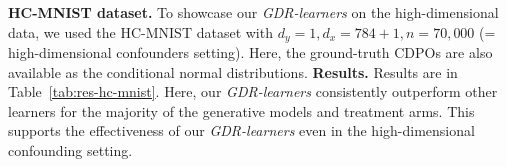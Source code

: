 \documentclass[dvipsnames]{article} %
\newcommand{\GDRlearners}{\emph{GDR-learners}\xspace}
\newcommand{\CDPOs}{CDPOs\xspace}
\begin{document}
\textbf{HC-MNIST dataset.} To showcase our \GDRlearners on the high-dimensional data, we used the HC-MNIST dataset with $d_y = 1, d_x = 784 + 1, n = 70,000$ \citep{jesson2021quantifying} (= high-dimensional confounders setting). 
Here, the ground-truth \CDPOs are also available as the conditional normal distributions. \textbf{Results.} Results are in Table~\ref{tab:res-hc-mnist}. Here, our \GDRlearners consistently outperform other learners for the majority of the generative models and treatment arms. This supports the effectiveness of our \GDRlearners even in the high-dimensional confounding setting. 


\begin{table}[t]
    \centering
    \vspace{-0.5cm}
    \caption{Results for the \textbf{HC-MNIST dataset}. Reported: median out-sample $W_2 \, \pm$ std over 20 runs.}
    \vspace{-0.3cm}
    \scalebox{0.66}{}
    \label{tab:res-hc-mnist}
    \vspace{-0.2cm}
\end{table}
\end{document}
